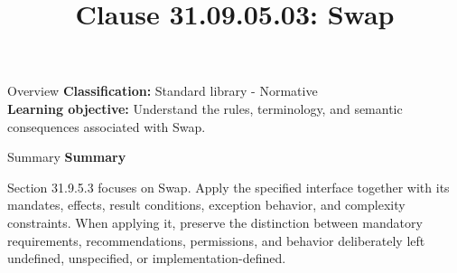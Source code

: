 \documentclass[10pt,letterpaper]{article}
\title{Clause 31.09.05.03: Swap}
\author{}
\date{}
\begin{document}
\maketitle
\begin{CornellOverviewBox}{Overview}
\textbf{Classification:} Standard library - Normative\\[2pt]
\textbf{Learning objective:} Understand the rules, terminology, and semantic consequences associated with Swap.
\end{CornellOverviewBox}\begin{CornellSummaryBox}{Summary}
{\sffamily\bfseries\color{Accent} Summary}\par\vspace{3pt}Section 31.9.5.3 focuses on Swap. Apply the specified interface together with its mandates, effects, result conditions, exception behavior, and complexity constraints. When applying it, preserve the distinction between mandatory requirements, recommendations, permissions, and behavior deliberately left undefined, unspecified, or implementation-defined.
\end{CornellSummaryBox}
\end{document}
